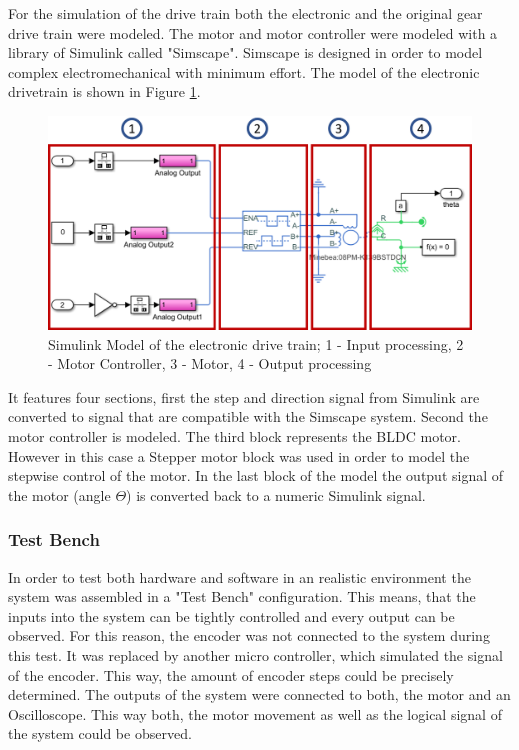 For the simulation of the drive train both the electronic and the original gear drive train were modeled. The motor and motor controller were modeled with a library of Simulink called "Simscape". Simscape is designed in order to model complex electromechanical with minimum effort. The model of the electronic drivetrain is shown in Figure \ref{SysEDriveT}.

\begin{figure}
    \begin{center}
    \includegraphics[width=12cm]{Pictures/SysEDriveT.png}
    \caption[Simulink Model of the electronic drive train]{Simulink Model of the electronic drive train; 1 - Input processing, 2 - Motor Controller, 3 - Motor, 4 - Output processing}
    \label{SysEDriveT}
    \end{center}
\end{figure}

It features four sections, first the step and direction signal from Simulink are converted to signal that are compatible with the Simscape system. Second the motor controller is modeled. The third block represents the BLDC motor. However in this case a Stepper motor block was used in order to model the stepwise control of the motor. In the last block of the model the output signal of the motor (angle $\Theta$) is converted back to a numeric Simulink signal.

\subsubsection{Test Bench}

In order to test both hardware and software in an realistic environment the system was assembled in a "Test Bench" configuration. This means, that the inputs into the system can be tightly controlled and every output can be observed. For this reason, the encoder was not connected to the system during this test. It was replaced by another micro controller, which simulated the signal of the encoder. This way, the amount of encoder steps could be precisely determined.
The outputs of the system were connected to both, the motor and an Oscilloscope. This way both, the motor movement as well as the logical signal of the system could be observed.\\

